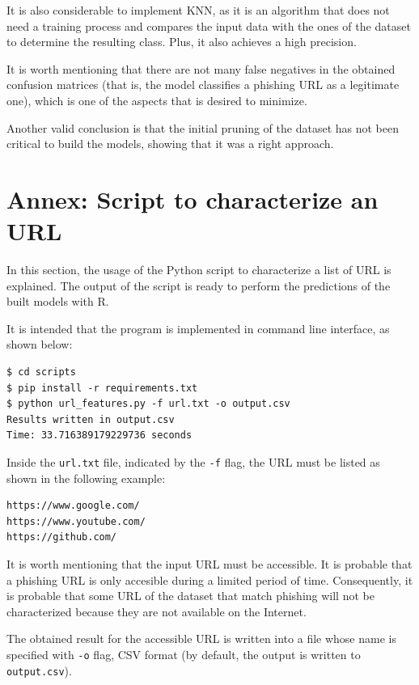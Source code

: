 \documentclass[12pt, a4paper]{article}
\begin{document}
    It is also considerable to implement KNN, as it is an algorithm that does not need a training process and compares the input data with the ones of the dataset to determine the resulting class. Plus, it also achieves a high precision.

    It is worth mentioning that there are not many false negatives in the obtained confusion matrices (that is, the model classifies a phishing URL as a legitimate one), which is one of the aspects that is desired to minimize.

    Another valid conclusion is that the initial pruning of the dataset has not been critical to build the models, showing that it was a right approach.

  \newpage

  \section*{Annex: Script to characterize an URL}

    In this section, the usage of the Python script to characterize a list of URL is explained. The output of the script is ready to perform the predictions of the built models with R.

    It is intended that the program is implemented in command line interface, as shown below:

    \begin{verbatim}
$ cd scripts
$ pip install -r requirements.txt
$ python url_features.py -f url.txt -o output.csv
Results written in output.csv
Time: 33.716389179229736 seconds
    \end{verbatim}

    Inside the \texttt{url.txt} file, indicated by the \texttt{-f} flag, the URL must be listed as shown in the following example:

    \begin{verbatim}
https://www.google.com/
https://www.youtube.com/
https://github.com/
    \end{verbatim}

    It is worth mentioning that the input URL must be accessible. It is probable that a phishing URL is only accesible during a limited period of time. Consequently, it is probable that some URL of the dataset that match phishing will not be characterized because they are not available on the Internet.

    The obtained result for the accessible URL is written into a file whose name is specified with \texttt{-o} flag, CSV format (by default, the output is written to \texttt{output.csv}).
\end{document}

